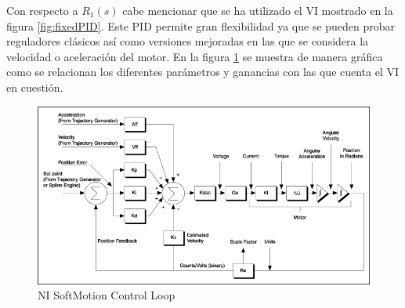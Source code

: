 Con respecto a $R_1(s)$ cabe mencionar que se ha utilizado el VI mostrado en la figura \ref{fig:fixedPID}. Este PID permite gran flexibilidad ya que se pueden probar reguladores clásicos así como versiones mejoradas en las que se considera la velocidad o aceleración del motor. En la figura \ref{fig:pidloop} se muestra de manera gráfica como se relacionan los diferentes parámetros y ganancias con las que cuenta el VI en cuestión.
\begin{figure}[htbp]
\centering
	\includegraphics[scale=0.5]{pidloop} 
	\caption{NI SoftMotion Control Loop} 
  	\label{fig:pidloop} 
\end{figure}

